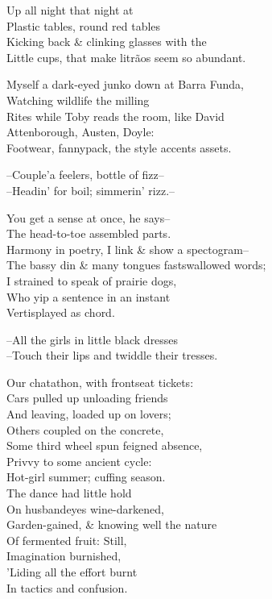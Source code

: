 


Up all night that night at \\
Plastic tables, round red tables \\
Kicking back \& clinking glasses with the \\
Little cups, that make litrãos seem so abundant.

Myself a dark-eyed junko down at Barra Funda, \\
Watching wildlife the milling \\
Rites while Toby reads the room, like David  \\
Attenborough, Austen, Doyle: \\
Footwear, fannypack, the style accents assets.

--Couple'a feelers, bottle of fizz-- \\
--Headin' for boil; simmerin' rizz.--

You get a sense at once, he says-- \\
The head-to-toe assembled parts. \\
Harmony in poetry, I link \& show a spectogram-- \\
The bassy din \& many tongues fastswallowed words; \\
I strained to speak of prairie dogs, \\
Who yip a sentence in an instant \\
Vertisplayed as chord.

--All the girls in little black dresses \\
--Touch their lips and twiddle their tresses. 

Our chatathon, with frontseat tickets: \\
Cars pulled up unloading friends \\
And leaving, loaded up on lovers; \\
Others coupled on the concrete, \\
Some third wheel spun feigned absence, \\
Privvy to some ancient cycle: \\
Hot-girl summer; cuffing season. \\
The dance had little hold \\
On husbandeyes wine-darkened, \\
Garden-gained, \& knowing well the nature \\
Of fermented fruit: Still, \\
Imagination burnished, \\
'Liding all the effort burnt \\
In tactics and confusion.

